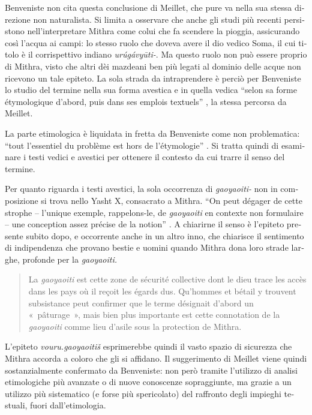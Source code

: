 \documentclass[french,output=paper,colorlinks,citecolor=brown]{../langscibook}
\begin{document}
\begin{otherlanguage}{italian}
Benveniste non cita questa conclusione di Meillet, che pure va nella sua stessa direzione non naturalista. Si limita a osservare che anche gli studi più recenti persistono nell’interpretare Mithra come colui che fa scendere la pioggia, assicurando così l’acqua ai campi: lo stesso ruolo che doveva avere il dio vedico Soma, il cui titolo è il corrispettivo indiano \textit{urúgávyūti{}-}. Ma questo ruolo non può essere proprio di Mithra, visto che altri dèi mazdeani ben più legati al dominio delle acque non ricevono un tale epiteto. La sola strada da intraprendere è perciò per Benveniste lo studio del termine nella sua forma avestica e in quella vedica “selon sa forme étymologique d'abord, puis dans ses emplois textuels” \citep[278]{Benveniste2015}, la stessa percorsa da Meillet. 

La parte etimologica è liquidata in fretta da Benveniste come non problematica: “tout l’essentiel du problème est hors de l’étymologie” \citep[278]{Benveniste2015}. Si tratta quindi di esaminare i testi vedici e avestici per ottenere il contesto da cui trarre il senso del termine.

Per quanto riguarda i testi avestici, la sola occorrenza di \textit{gaoyaoiti-} non in composizione si trova nello Yasht X, consacrato a Mithra. “On peut dégager de cette strophe – l’unique exemple, rappelons-le, de \textit{gaoyaoiti} en contexte non formulaire – une conception assez précise de la notion” \citep[281]{Benveniste2015}. A chiarirne il senso è l’epiteto presente subito dopo, e occorrente anche in un altro inno, che chiarisce il sentimento di indipendenza che provano bestie e uomini quando Mithra dona loro strade larghe, profonde per la \textit{gaoyaoiti.}

\begin{quote}
    La \textit{gaoyaoiti} est cette zone de sécurité collective dont le dieu trace les accès dans les pays où il reçoit les égards dus. Qu’hommes et bétail y trouvent subsistance peut confirmer que le terme désignait d’abord un «~pâturage~», mais bien plus importante est cette connotation de la \textit{gaoyaoiti} comme lieu d’asile sous la protection de Mithra. \citep[281]{Benveniste2015}
\end{quote}

L’epiteto \textit{vouru.gaoyaoitiš} esprimerebbe quindi il vasto spazio di sicurezza che Mithra accorda a coloro che gli si affidano. Il suggerimento di Meillet viene quindi sostanzialmente confermato da Benveniste: non però tramite l’utilizzo di analisi etimologiche più avanzate o di nuove conoscenze sopraggiunte, ma grazie a un utilizzo più sistematico (e forse più spericolato) del raffronto degli impieghi testuali, fuori dall’etimologia.


\end{otherlanguage}
\end{document}
